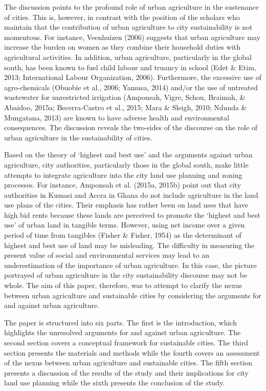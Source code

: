 The discussion points to the profound role of urban agriculture in the sustenance of cities. This is, however, in contrast with the position of the scholars who maintain that the contribution of urban agriculture to city sustainability is not momentous. For instance, Veenhuizen (2006) suggests that urban agriculture may increase the burden on women as they combine their household duties with agricultural activities. In addition, urban agriculture, particularly in the global south, has been known to fuel child labour and truancy in school (Edet \& Etim, 2013; International Labour Organization, 2006). Furthermore, the excessive use of agro-chemicals (Obuobie et al., 2006; Yamusa, 2014) and/or the use of untreated wastewater for unrestricted irrigation (Amponsah, Vigre, Schou, Braimah, \& Abaidoo, 2015a; Becerra-Castro et al., 2015; Mara \& Sleigh, 2010; Ndunda \& Mungatana, 2013) are known to have adverse health and environmental consequences. The discussion reveals the two-sides of the discourse on the role of urban agriculture in the sustainability of cities.

Based on the theory of ‘highest and best use’ and the arguments against urban agriculture, city authorities, particularly those in the global south, make little attempts to integrate agriculture into the city land use planning and zoning processes. For instance, Amponsah et al. (2015a, 2015b) point out that city authorities in Kumasi and Accra in Ghana do not include agriculture in the land use plans of the cities. Their emphasis has rather been on land uses that have high bid rents because these lands are perceived to promote the ‘highest and best use’ of urban land in tangible terms. However, using net income over a given period of time from tangibles (Fisher \& Fisher, 1954) as the determinant of highest and best use of land may be misleading. The difficulty in measuring the present value of social and environmental services may lead to an underestimation of the importance of urban agriculture. In this case, the picture portrayed of urban agriculture in the city sustainability discourse may not be whole. The aim of this paper, therefore, was to attempt to clarify the nexus between urban agriculture and sustainable cities by considering the arguments for and against urban agriculture.

The paper is structured into six parts. The first is the introduction, which highlights the unresolved arguments for and against urban agriculture. The second section covers a conceptual framework for sustainable cities. The third section presents the materials and methods while the fourth covers an assessment of the nexus between urban agriculture and sustainable cities. The fifth section presents a discussion of the results of the study and their implications for city land use planning while the sixth presents the conclusion of the study.

